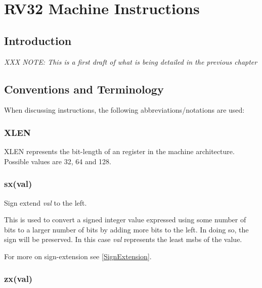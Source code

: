 \chapter{RV32 Machine Instructions}
\label{chapter:RV32}

\section{Introduction}

{\em XXX NOTE: This is a first draft of what is being detailed in the previous chapter}

\section{Conventions and Terminology}

When discussing instructions, the following abbreviations/notations are used:

\subsection{XLEN}

XLEN represents the bit-length of an  register in the machine architecture.
Possible values are 32, 64 and 128.

\subsection{sx(val)}
\label{extension:sx}

Sign extend {\em val} to the left.

This is used to convert a signed integer value expressed using some number of 
bits to a larger number of bits by adding more bits to the left.  In doing so, 
the sign will be preserved.  In this case {\em val} represents the least 
\acrshort{msb}s of the value.  

For more on sign-extension see \autoref{SignExtension}.

\subsection{zx(val)}
\label{extension:zx}

